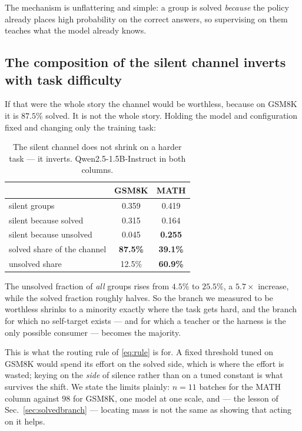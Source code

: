 The mechanism is unflattering and simple: a group is solved \emph{because} the policy already
places high probability on the correct answers, so supervising on them teaches what the model
already knows.

\subsection{The composition of the silent channel inverts with task difficulty}
\label{sec:flip}

If that were the whole story the channel would be worthless, because on GSM8K it is $87.5\%$
solved. It is not the whole story. Holding the model and configuration fixed and changing only
the training task:

\begin{table}[t]
\centering\small
\caption{The silent channel does not shrink on a harder task --- it inverts.
Qwen2.5-1.5B-Instruct in both columns.}
\label{tab:flip}
\begin{tabular}{lcc}
\toprule
 & GSM8K & MATH \\
\midrule
silent groups                    & 0.359 & 0.419 \\
\quad silent because solved      & 0.315 & 0.164 \\
\quad silent because unsolved    & 0.045 & \textbf{0.255} \\
\midrule
solved share of the channel      & \textbf{87.5\%} & \textbf{39.1\%} \\
unsolved share                   & 12.5\% & \textbf{60.9\%} \\
\bottomrule
\end{tabular}
\end{table}

The unsolved fraction of \emph{all} groups rises from $4.5\%$ to $25.5\%$, a $5.7\times$
increase, while the solved fraction roughly halves. So the branch we measured to be worthless
shrinks to a minority exactly where the task gets hard, and the branch for which no
self-target exists --- and for which a teacher or the harness is the only possible consumer
--- becomes the majority.

This is what the routing rule of \eqref{eq:rule} is for. A fixed threshold tuned on GSM8K
would spend its effort on the solved side, which is where the effort is wasted; keying on the
\emph{side} of silence rather than on a tuned constant is what survives the shift. We state
the limits plainly: $n=11$ batches for the MATH column against $98$ for GSM8K, one model at
one scale, and --- the lesson of Sec.~\ref{sec:solvedbranch} --- locating mass is not the same
as showing that acting on it helps.

